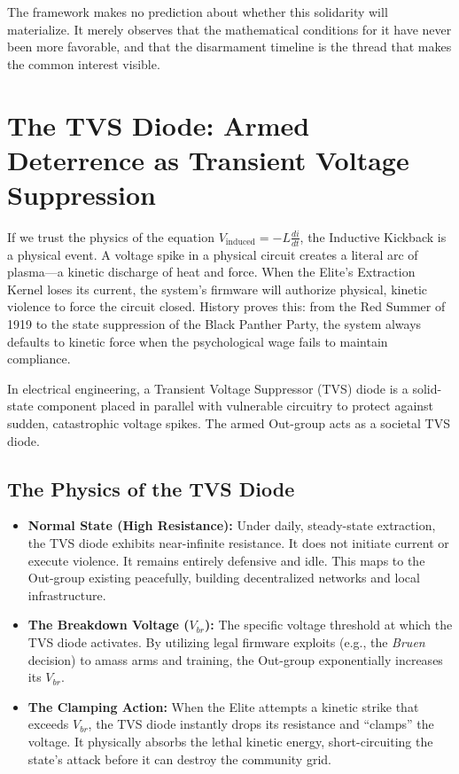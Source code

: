 The framework makes no prediction about whether this solidarity will materialize. It merely observes that the mathematical conditions for it have never been more favorable, and that the disarmament timeline is the thread that makes the common interest visible.

\section{The TVS Diode: Armed Deterrence as Transient Voltage Suppression}
\label{sec:tvs_diode}

If we trust the physics of the equation $V_{\text{induced}} = -L \frac{di}{dt}$, the Inductive Kickback is a physical event. A voltage spike in a physical circuit creates a literal arc of plasma---a kinetic discharge of heat and force. When the Elite's Extraction Kernel loses its current, the system's firmware will authorize physical, kinetic violence to force the circuit closed. History proves this: from the Red Summer of 1919 to the state suppression of the Black Panther Party, the system always defaults to kinetic force when the psychological wage fails to maintain compliance.

In electrical engineering, a Transient Voltage Suppressor (TVS) diode is a solid-state component placed in parallel with vulnerable circuitry to protect against sudden, catastrophic voltage spikes. The armed Out-group acts as a societal TVS diode.

\subsection{The Physics of the TVS Diode}

\begin{definition}
\begin{itemize}
\item \textbf{Normal State (High Resistance):} Under daily, steady-state extraction, the TVS diode exhibits near-infinite resistance. It does not initiate current or execute violence. It remains entirely defensive and idle. This maps to the Out-group existing peacefully, building decentralized networks and local infrastructure.

\item \textbf{The Breakdown Voltage ($V_{br}$):} The specific voltage threshold at which the TVS diode activates. By utilizing legal firmware exploits (e.g., the \textit{Bruen} decision) to amass arms and training, the Out-group exponentially increases its $V_{br}$.

\item \textbf{The Clamping Action:} When the Elite attempts a kinetic strike that exceeds $V_{br}$, the TVS diode instantly drops its resistance and ``clamps'' the voltage. It physically absorbs the lethal kinetic energy, short-circuiting the state's attack before it can destroy the community grid.
\end{itemize}
\end{definition}

